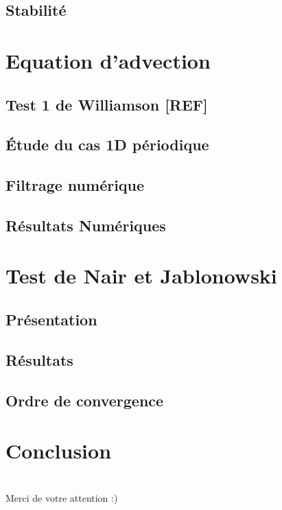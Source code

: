 \documentclass[11pt]{beamer}
\begin{document}
\subsection{Stabilité}

\section{Equation d'advection}

\subsection{Test 1 de Williamson [REF]}

\subsection{\'Etude du cas 1D périodique}

\subsection{Filtrage numérique}

\subsection{Résultats Numériques}

\section{Test de Nair et Jablonowski}

\subsection{Présentation}

\subsection{Résultats}

\subsection{Ordre de convergence}

\section{Conclusion}





\section*{}
\begin{frame}
\begin{center}
Merci de votre attention :)
\end{center}
\end{frame}
\end{document}
